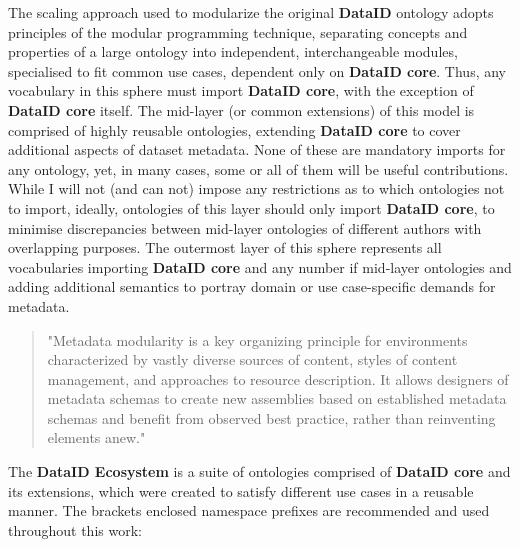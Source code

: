 \documentclass[a4paper,english,twoside,BCOR1.5cm,headsepline,DIV12,appendixprefix,final,12pt]{scrbook}
\newcommand{\ecosystem}{{\ttfamily\bfseries DataID Ecosystem}\xspace}
\newcommand{\dataid}{{\ttfamily\bfseries DataID}\xspace}
\newcommand{\core}{{\ttfamily\bfseries DataID core}\xspace}
\begin{document}
The scaling approach used to modularize the original \dataid ontology adopts principles of the modular programming technique, separating concepts and properties of a large ontology into independent, interchangeable modules, specialised to fit common use cases, dependent only on \core. Thus, any vocabulary in this sphere must import \core, with the exception of \core itself. 
The mid-layer (or common extensions) of this model is comprised of highly reusable ontologies, extending \core to cover additional aspects of dataset metadata. None of these are mandatory imports for any ontology, yet, in many cases, some or all of them will be useful contributions. While I will not (and can not) impose any restrictions as to which ontologies not to import, ideally, ontologies of this layer should only import \core, to minimise discrepancies between mid-layer ontologies of different authors with overlapping purposes. The outermost layer of this sphere represents all vocabularies importing \core and any number if mid-layer ontologies and adding additional semantics to portray domain or use case-specific demands for metadata.

\begin{quote}
"Metadata modularity is a key organizing principle for environments characterized by vastly diverse sources of content, styles of content management, and approaches to resource description. It allows designers of metadata schemas to create new assemblies based on established metadata schemas and benefit from observed best practice, rather than reinventing elements anew." \cite{MetadataPrinciples}
\end{quote}

The \ecosystem is a suite of ontologies comprised of \core and its extensions, which were created to satisfy different use cases in a reusable manner. The brackets enclosed namespace prefixes are recommended and used throughout this work:
\end{document}
